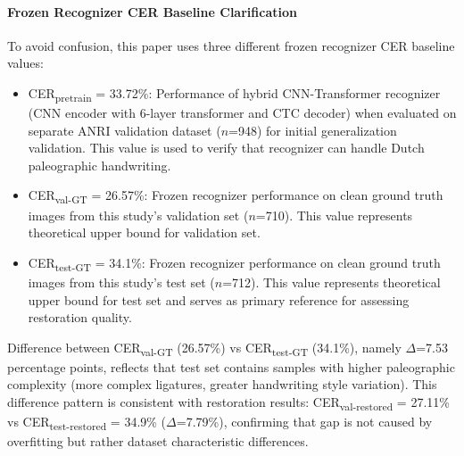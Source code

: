\documentclass[journal]{IEEEtran}
\begin{document}
\paragraph{Frozen Recognizer CER Baseline Clarification} To avoid confusion, this paper uses three different frozen recognizer CER baseline values:\vspace{-0.5em}
\begin{itemize}[itemsep=0pt]
    \item CER\textsubscript{pretrain} = 33.72\%: Performance of hybrid CNN-Transformer recognizer (CNN encoder with 6-layer transformer and CTC decoder) when evaluated on separate ANRI validation dataset ($n$=948) for initial generalization validation. This value is used to verify that recognizer can handle Dutch paleographic handwriting.
    \item CER\textsubscript{val-GT} = 26.57\%: Frozen recognizer performance on clean ground truth images from this study's validation set ($n$=710). This value represents theoretical upper bound for validation set.
    \item CER\textsubscript{test-GT} = 34.1\%: Frozen recognizer performance on clean ground truth images from this study's test set ($n$=712). This value represents theoretical upper bound for test set and serves as primary reference for assessing restoration quality.
\end{itemize}
\vspace{0.5em}
Difference between CER\textsubscript{val-GT} (26.57\%) vs CER\textsubscript{test-GT} (34.1\%), namely $\Delta$=7.53 percentage points, reflects that test set contains samples with higher paleographic complexity (more complex ligatures, greater handwriting style variation). This difference pattern is consistent with restoration results: CER\textsubscript{val-restored} = 27.11\% vs CER\textsubscript{test-restored} = 34.9\% ($\Delta$=7.79\%), confirming that gap is not caused by overfitting but rather dataset characteristic differences.
\end{document}
